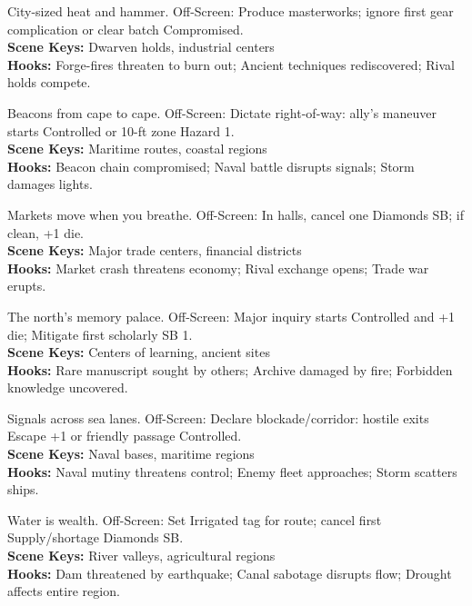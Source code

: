 \documentclass[12pt]{article}
\begin{document}
\begin{description}[leftmargin=*]
  \item[\textbf{Grand Forge--Citadel}] City-sized heat and hammer. Off-Screen: Produce masterworks; ignore first gear complication or clear batch Compromised. \\
  \textbf{Scene Keys:} Dwarven holds, industrial centers \\
  \textbf{Hooks:} Forge-fires threaten to burn out; Ancient techniques rediscovered; Rival holds compete.

  \item[\textbf{Harbor Light Consortium}] Beacons from cape to cape. Off-Screen: Dictate right-of-way: ally's maneuver starts Controlled or 10-ft zone Hazard 1. \\
  \textbf{Scene Keys:} Maritime routes, coastal regions \\
  \textbf{Hooks:} Beacon chain compromised; Naval battle disrupts signals; Storm damages lights.

  \item[\textbf{Grand Exchange Charter}] Markets move when you breathe. Off-Screen: In halls, cancel one Diamonds SB; if clean, +1 die. \\
  \textbf{Scene Keys:} Major trade centers, financial districts \\
  \textbf{Hooks:} Market crash threatens economy; Rival exchange opens; Trade war erupts.

  \item[\textbf{Thepyrgosi Great Library}] The north's memory palace. Off-Screen: Major inquiry starts Controlled and +1 die; Mitigate first scholarly SB 1. \\
  \textbf{Scene Keys:} Centers of learning, ancient sites \\
  \textbf{Hooks:} Rare manuscript sought by others; Archive damaged by fire; Forbidden knowledge uncovered.

  \item[\textbf{Kahfagian Fleet Command}] Signals across sea lanes. Off-Screen: Declare blockade/corridor: hostile exits Escape +1 or friendly passage Controlled. \\
  \textbf{Scene Keys:} Naval bases, maritime regions \\
  \textbf{Hooks:} Naval mutiny threatens control; Enemy fleet approaches; Storm scatters ships.

  \item[\textbf{Oshiiran Hydraulic Empire}] Water is wealth. Off-Screen: Set Irrigated tag for route; cancel first Supply/shortage Diamonds SB. \\
  \textbf{Scene Keys:} River valleys, agricultural regions \\
  \textbf{Hooks:} Dam threatened by earthquake; Canal sabotage disrupts flow; Drought affects entire region.


\end{description}
\end{document}
